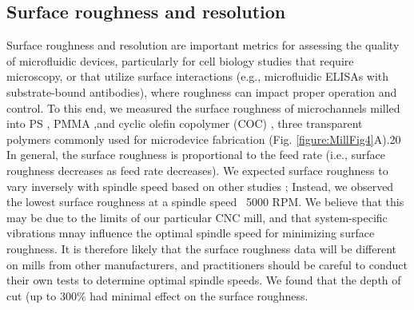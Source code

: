 \subsection{Surface roughness and resolution}
Surface roughness and resolution are important metrics for assessing the quality of microfluidic devices, particularly for cell biology studies that require microscopy, or that utilize surface interactions (e.g., microfluidic ELISAs with substrate-bound antibodies), where roughness can impact proper operation and control. To this end, we measured the surface roughness of microchannels milled into PS \cite{Young2011, Chen2008a}, PMMA \cite{Wabuyele2001, Klank2002},and cyclic olefin copolymer (COC) \cite{Steigert2007}, three transparent polymers commonly used for microdevice fabrication (Fig. \ref{figure:MillFig4}A).20 In general, the surface roughness is proportional to the feed rate (i.e., surface roughness decreases as feed rate decreases). We expected surface roughness to vary inversely with spindle speed based on other studies \cite{Kiswanto2014}; Instead, we observed the lowest surface roughness at a spindle speed ~5000 RPM. We believe that this may be due to the limits of our particular CNC mill, and that system-specific vibrations \cite{Zhang2007} mnay influence the optimal spindle speed for minimizing surface roughness. It is therefore likely that the surface roughness data will be different on mills from other manufacturers, and practitioners should be careful to conduct their own tests to determine optimal spindle speeds. We found that the depth of cut (up to 300\% had minimal effect on the surface roughness.

